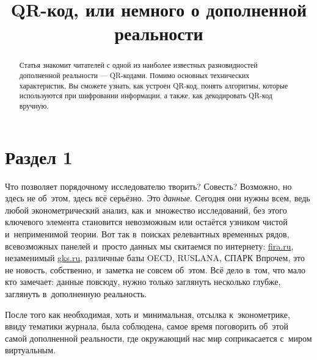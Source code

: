 \documentclass[final,pdftex]{../../template/epsilonj}
\begin{document}
\setcounter{page}{37}
	
	\begin{frontmatter}
		\title{QR-код, или немного о дополненной реальности}
		
		\begin{aug}
			\author{ }%
			
			
			\address{НИУ ВШЭ, Москва.}
		\end{aug}
		
		\begin{abstract}
			Статья знакомит читателей с одной из наиболее известных разновидностей дополненной реальности --- QR-кодами. Помимо основных технических характеристик, Вы сможете узнать, как устроен QR-код, понять алгоритмы, которые используются при шифровании информации, а также, как декодировать QR-код вручную. 
		\end{abstract}
		
		\begin{keyword}
		\end{keyword}
		
	\end{frontmatter}
	
	
	\section{Раздел 1}


Что позволяет порядочному исследователю творить? Совесть?  Возможно, но здесь не об~этом, здесь всё серьёзно. Это \textit{данные}. Сегодня они нужны всем, ведь любой эконометрический анализ, как и~множество исследований, без этого ключевого элемента становится невозможным или остаётся узником чистой и~неприменимой теории. Вот так в~поисках релевантных временных рядов, всевозможных панелей и~просто данных мы скитаемся по интернету: \href{http://www.fira.ru}{fira.ru}, незаменимый \href{http://www.gks.ru}{gks.ru}, различные базы OECD, RUSLANA, СПАРК\ldotst{} Впрочем, это не новость, собственно, и~заметка не совсем об~этом. Всё дело в~том, что мало кто замечает: данные повсюду, нужно только заглянуть несколько глубже, заглянуть в~дополненную реальность. 

После того как необходимая, хоть и~минимальная, отсылка к~эконометрике, ввиду тематики журнала, была соблюдена, самое время поговорить об~этой самой дополненной реальности, где окружающий нас мир соприкасается с~миром виртуальным.
\end{document}
